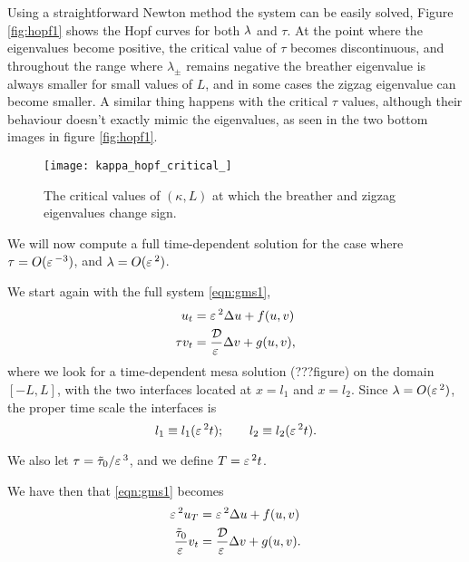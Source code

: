 Using a straightforward Newton method the system can be easily solved, Figure \ref{fig:hopf1} shows the Hopf curves for both $\lambda$ and $\tau$. At the point where the eigenvalues become positive, the critical value of $\tau$ becomes discontinuous, and throughout the range where $\lambda_{\pm}$ remains negative the breather eigenvalue is always smaller for small values of $L$, and in some cases the zigzag eigenvalue can become smaller. A similar thing happens with the critical $\tau$ values, although their behaviour doesn't exactly mimic the eigenvalues, as seen in the two bottom images in figure \ref{fig:hopf1}.
% 
\begin{figure}[htb]
\begin{center}
\texttt{[image: kappa\_hopf\_critical\_]}
\caption{The critical values of $(\kappa,L)$ at which the breather and zigzag eigenvalues change sign.}
\label{fig:hopf_kappa}
\end{center}
\end{figure}
% 


We will now compute a full time-dependent solution for the case where $\tau=O(\varepsilon\,^{-3})$, and $\lambda=O(\varepsilon\,^2)$.

We start again with the full system \eqref{eqn:gms1},
% 
\begin{equation*}
\label{eqn:gms2}
\begin{split}
\begin{aligned}
	u_t &= \varepsilon\,^2\Delta u + f(u,v) \\
	\tau v_t &= \frac{\mathcal{D}}{\varepsilon\,}\Delta v + g(u,v),
\end{aligned}
\end{split}
\end{equation*}
% 
where we look for a time-dependent mesa solution (???figure) on the domain $[-L,L]$, with the two interfaces located at $x=l_1$ and $x=l_2$. Since $\lambda=O(\varepsilon\,^2)$, the proper time scale the interfaces  is
% 
\[
  l_1 \equiv l_1(\varepsilon\,^2t);\qquad l_2 \equiv l_2(\varepsilon\,^2t).
\]
% 

We also let $\tau = \tilde{\tau}_0/\varepsilon\,^3$, and we define $T = \varepsilon\,^2t$.

We have then that \eqref{eqn:gms1} becomes
% 
\begin{equation}
\label{eqn:gms3}
\begin{split}
\begin{aligned}
	\varepsilon\,^2u_T &= \varepsilon\,^2\Delta u + f(u,v) \\
	\frac{\tilde{\tau}_0}{\varepsilon\,} v_t &= \frac{\mathcal{D}}{\varepsilon\,}\Delta v + g(u,v).
\end{aligned}
\end{split}
\end{equation}
% 

